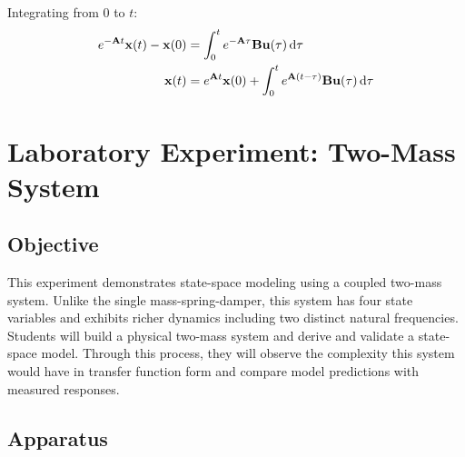Integrating from 0 to $t$:
\begin{align}
    e^{-\mathbf{A}t}\mathbf{x}(t) - \mathbf{x}(0) &= \int_0^t e^{-\mathbf{A}\tau}\mathbf{B}\mathbf{u}(\tau)\,\mathrm{d}\tau \\
    \mathbf{x}(t) &= e^{\mathbf{A}t}\mathbf{x}(0) + \int_0^t e^{\mathbf{A}(t-\tau)}\mathbf{B}\mathbf{u}(\tau)\,\mathrm{d}\tau
\end{align}

\section{Laboratory Experiment: Two-Mass System}

\subsection{Objective}

This experiment demonstrates state-space modeling using a coupled two-mass system. Unlike the single mass-spring-damper, this system has four state variables and exhibits richer dynamics including two distinct natural frequencies. Students will build a physical two-mass system and derive and validate a state-space model. Through this process, they will observe the complexity this system would have in transfer function form and compare model predictions with measured responses.

\subsection{Apparatus}

